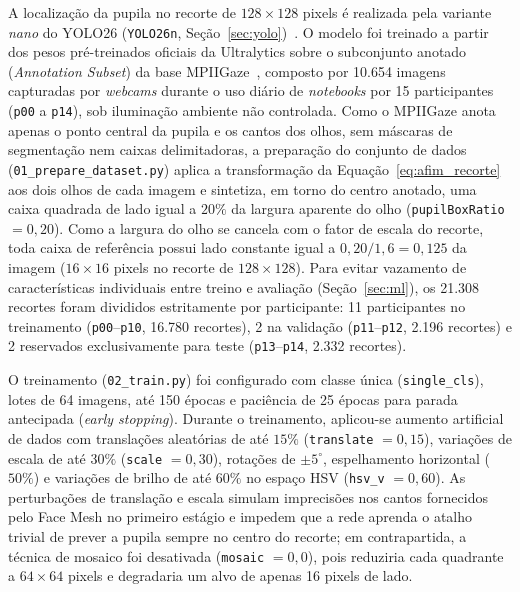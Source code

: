 A localização da pupila no recorte de $128 \times 128$ pixels é realizada pela variante \textit{nano} do YOLO26 (\texttt{YOLO26n}, Seção~\ref{sec:yolo})~\cite{yolo26}. O modelo foi treinado a partir dos pesos pré-treinados oficiais da Ultralytics sobre o subconjunto anotado (\textit{Annotation Subset}) da base MPIIGaze~\cite{zhang2015mpiigaze}, composto por 10.654 imagens capturadas por \textit{webcams} durante o uso diário de \textit{notebooks} por 15 participantes (\texttt{p00} a \texttt{p14}), sob iluminação ambiente não controlada. Como o MPIIGaze anota apenas o ponto central da pupila e os cantos dos olhos, sem máscaras de segmentação nem caixas delimitadoras, a preparação do conjunto de dados (\texttt{01\_\allowbreak prepare\_\allowbreak dataset.py}) aplica a transformação da Equação~\ref{eq:afim_recorte} aos dois olhos de cada imagem e sintetiza, em torno do centro anotado, uma caixa quadrada de lado igual a $20\%$ da largura aparente do olho (\texttt{pupilBoxRatio} $= 0{,}20$). Como a largura do olho se cancela com o fator de escala do recorte, toda caixa de referência possui lado constante igual a $0{,}20 / 1{,}6 = 0{,}125$ da imagem ($16 \times 16$ pixels no recorte de $128 \times 128$). Para evitar vazamento de características individuais entre treino e avaliação (Seção~\ref{sec:ml}), os 21.308 recortes foram divididos estritamente por participante: 11 participantes no treinamento (\texttt{p00}--\texttt{p10}, 16.780 recortes), 2 na validação (\texttt{p11}--\texttt{p12}, 2.196 recortes) e 2 reservados exclusivamente para teste (\texttt{p13}--\texttt{p14}, 2.332 recortes).

O treinamento (\texttt{02\_train.py}) foi configurado com classe única (\texttt{single\_cls}), lotes de 64 imagens, até 150 épocas e paciência de 25 épocas para parada antecipada (\textit{early stopping}). Durante o treinamento, aplicou-se aumento artificial de dados com translações aleatórias de até $15\%$ (\texttt{translate} $= 0{,}15$), variações de escala de até $30\%$ (\texttt{scale} $= 0{,}30$), rotações de $\pm 5^\circ$, espelhamento horizontal ($50\%$) e variações de brilho de até $60\%$ no espaço HSV (\texttt{hsv\_v} $= 0{,}60$). As perturbações de translação e escala simulam imprecisões nos cantos fornecidos pelo Face Mesh no primeiro estágio e impedem que a rede aprenda o atalho trivial de prever a pupila sempre no centro do recorte; em contrapartida, a técnica de mosaico foi desativada (\texttt{mosaic} $= 0{,}0$), pois reduziria cada quadrante a $64 \times 64$ pixels e degradaria um alvo de apenas 16 pixels de lado.

